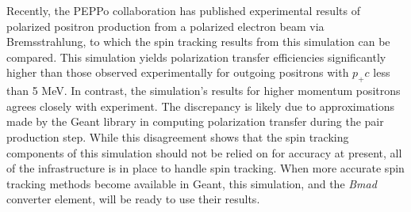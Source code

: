 \documentclass[letter,
               biblatex,     %
               keeplastbox,   %
               ]{jacow}
\newcommand{\bmad}{\textit{Bmad}}
\begin{document}
Recently, the PEPPo collaboration %
has published experimental results of polarized positron production from a polarized electron beam via Bremsstrahlung, to which the spin tracking results from this simulation can be compared.
This simulation yields polarization transfer efficiencies significantly higher than those observed experimentally for outgoing positrons with $p_+ c$ less than 5 MeV.
In contrast, the simulation's results for higher momentum positrons agrees closely with experiment.
The discrepancy is likely due to approximations made by the Geant library in computing polarization transfer during the pair production step. %
While this disagreement shows that the spin tracking components of this simulation should not be relied on for accuracy at present, all of the infrastructure is in place to handle spin tracking.
When more accurate spin tracking methods become available in Geant, this simulation, and the \bmad \, converter element, will be ready to use their results.
\end{document}
